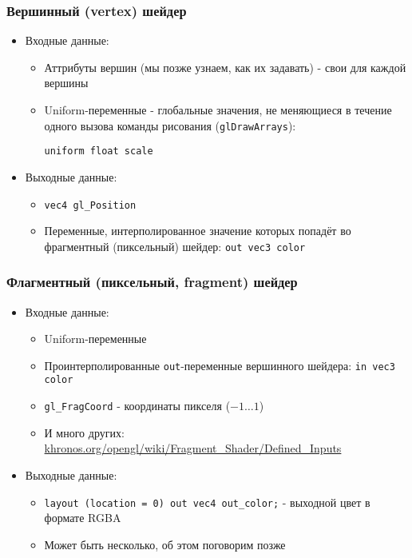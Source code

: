 \documentclass{beamer}
\begin{document}
\begin{frame}[fragile]
\frametitle{Вершинный (vertex) шейдер}
\begin{itemize}
\pause
\item Входные данные:
\pause
\begin{itemize}
\item Аттрибуты вершин (мы позже узнаем, как их задавать) - свои для каждой вершины
\pause
\item Uniform-переменные - глобальные значения, не меняющиеся в течение одного вызова команды рисования (\verb|glDrawArrays|):

\verb|uniform float scale|
\end{itemize}
\pause
\item Выходные данные:
\begin{itemize}
\item \verb|vec4 gl_Position|
\pause
\item Переменные, интерполированное значение которых попадёт во фрагментный (пиксельный) шейдер: \verb|out vec3 color|
\end{itemize}
\end{itemize}
\end{frame}

\begin{frame}[fragile]
\frametitle{Флагментный (пиксельный, fragment) шейдер}
\begin{itemize}
\pause
\item Входные данные:
\pause
\begin{itemize}
\item Uniform-переменные
\pause
\item Проинтерполированные \verb|out|-переменные вершинного шейдера: \verb|in vec3 color|
\pause
\item \verb|gl_FragCoord| - координаты пикселя (\begin{math}-1 \dots 1\end{math})
\pause
\item И много других: \href{https://www.khronos.org/opengl/wiki/Fragment_Shader/Defined_Inputs}{khronos.org/opengl/wiki/Fragment\_Shader/Defined\_Inputs}
\end{itemize}
\pause
\item Выходные данные:
\begin{itemize}
\item \verb|layout (location = 0) out vec4 out_color;| - выходной цвет в формате RGBA
\pause
\item Может быть несколько, об этом поговорим позже
\end{itemize}
\end{itemize}
\end{frame}
\end{document}
